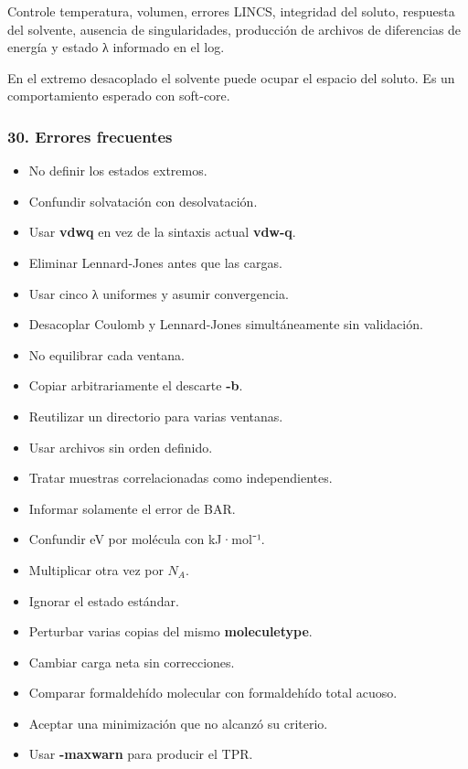 \documentclass[
  spanish,
  11pt,
  a4paper]{article}
\providecommand{\tightlist}{%
  \setlength{\itemsep}{0pt}\setlength{\parskip}{0pt}}
\begin{document}
Controle temperatura, volumen, errores LINCS, integridad del soluto,
respuesta del solvente, ausencia de singularidades, producción de
archivos de diferencias de energía y estado λ informado en el log.

En el extremo desacoplado el solvente puede ocupar el espacio del
soluto. Es un comportamiento esperado con soft-core.

\subsubsection{30. Errores frecuentes}\label{errores-frecuentes-1}

\begin{itemize}
\tightlist
\item
  No definir los estados extremos.
\item
  Confundir solvatación con desolvatación.
\item
  Usar \textbf{vdwq} en vez de la sintaxis actual \textbf{vdw-q}.
\item
  Eliminar Lennard-Jones antes que las cargas.
\item
  Usar cinco λ uniformes y asumir convergencia.
\item
  Desacoplar Coulomb y Lennard-Jones simultáneamente sin validación.
\item
  No equilibrar cada ventana.
\item
  Copiar arbitrariamente el descarte \textbf{-b}.
\item
  Reutilizar un directorio para varias ventanas.
\item
  Usar archivos sin orden definido.
\item
  Tratar muestras correlacionadas como independientes.
\item
  Informar solamente el error de BAR.
\item
  Confundir eV por molécula con kJ·mol⁻¹.
\item
  Multiplicar otra vez por \(N_A\).
\item
  Ignorar el estado estándar.
\item
  Perturbar varias copias del mismo \textbf{moleculetype}.
\item
  Cambiar carga neta sin correcciones.
\item
  Comparar formaldehído molecular con formaldehído total acuoso.
\item
  Aceptar una minimización que no alcanzó su criterio.
\item
  Usar \textbf{-maxwarn} para producir el TPR.
\end{itemize}
\end{document}
